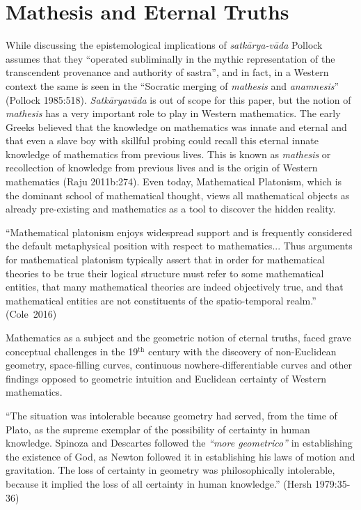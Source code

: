 \section*{Mathesis and Eternal Truths}

While discussing the epistemological implications of {\sl satkārya-vāda} Pollock assumes that they ``operated subliminally in the mythic representation of the transcendent provenance and authority of sastra'', and in fact, in a Western context the same is seen in the ``Socratic merging of {\sl mathesis} and {\sl anamnesis}'' (Pollock 1985:518). {\sl Satkāryavāda} is out of scope for this paper, but the notion of {\sl mathesis} has a very important role to play in Western mathematics. The early Greeks believed that the knowledge on mathematics was innate and eternal and that even a slave boy with skillful probing could recall this eternal innate knowledge of mathematics from previous lives. This is known as {\sl mathesis} or recollection of knowledge from previous lives and is the origin of Western mathematics (Raju 2011b:274). Even today, Mathematical Platonism, which is the dominant school of mathematical thought, views all mathematical objects as already pre-existing and mathematics as a tool to discover the hidden reality. 
\begin{myquote}
``Mathematical platonism enjoys widespread support and is frequently considered the default metaphysical position with respect to mathematics... Thus arguments for mathematical platonism typically assert that in order for mathematical theories to be true their logical structure must refer to some mathematical entities, that many mathematical theories are indeed objectively true, and that mathematical entities are not constituents of the spatio-temporal realm.''
\hfill \hbox{(Cole 2016)}
\end{myquote}

Mathematics as a subject and the geometric notion of eternal truths, faced grave conceptual challenges in the 19$^{\text{th}}$ century with the discovery of non-Euclidean geometry, space-filling curves, continuous nowhere-differentiable curves and other findings opposed to geometric intuition and Euclidean certainty of Western mathematics.
\begin{myquote}
``The situation was intolerable because geometry had served, from the time of Plato, as the supreme exemplar of the possibility of certainty in human knowledge. Spinoza and Descartes followed the {\sl``more geometrico''} in establishing the existence of God, as Newton followed it in establishing his laws of motion and gravitation. The loss of certainty in geometry was philosophically intolerable, because it implied the loss of all certainty in human knowledge.''	
\hfill (Hersh 1979:35-36)
\end{myquote}

